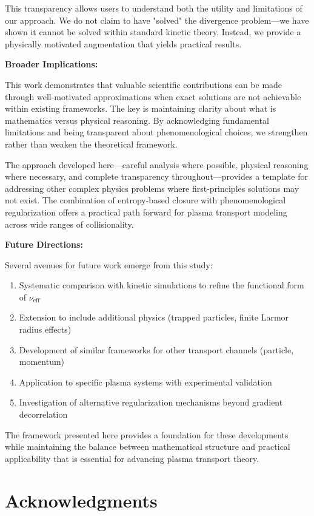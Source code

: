 \documentclass[12pt,a4paper]{article}
\newcommand{\eff}{\text{eff}}
\begin{document}
This transparency allows users to understand both the utility and limitations of our approach. We do not claim to have "solved" the divergence problem—we have shown it cannot be solved within standard kinetic theory. Instead, we provide a physically motivated augmentation that yields practical results.

\textbf{Broader Implications:}

This work demonstrates that valuable scientific contributions can be made through well-motivated approximations when exact solutions are not achievable within existing frameworks. The key is maintaining clarity about what is mathematics versus physical reasoning. By acknowledging fundamental limitations and being transparent about phenomenological choices, we strengthen rather than weaken the theoretical framework.

The approach developed here—careful analysis where possible, physical reasoning where necessary, and complete transparency throughout—provides a template for addressing other complex physics problems where first-principles solutions may not exist. The combination of entropy-based closure with phenomenological regularization offers a practical path forward for plasma transport modeling across wide ranges of collisionality.

\textbf{Future Directions:}

Several avenues for future work emerge from this study:
\begin{enumerate}[leftmargin=*]
\item Systematic comparison with kinetic simulations to refine the functional form of $\nu_{\eff}$
\item Extension to include additional physics (trapped particles, finite Larmor radius effects)
\item Development of similar frameworks for other transport channels (particle, momentum)
\item Application to specific plasma systems with experimental validation
\item Investigation of alternative regularization mechanisms beyond gradient decorrelation
\end{enumerate}

The framework presented here provides a foundation for these developments while maintaining the balance between mathematical structure and practical applicability that is essential for advancing plasma transport theory.

\section*{Acknowledgments}
\end{document}
